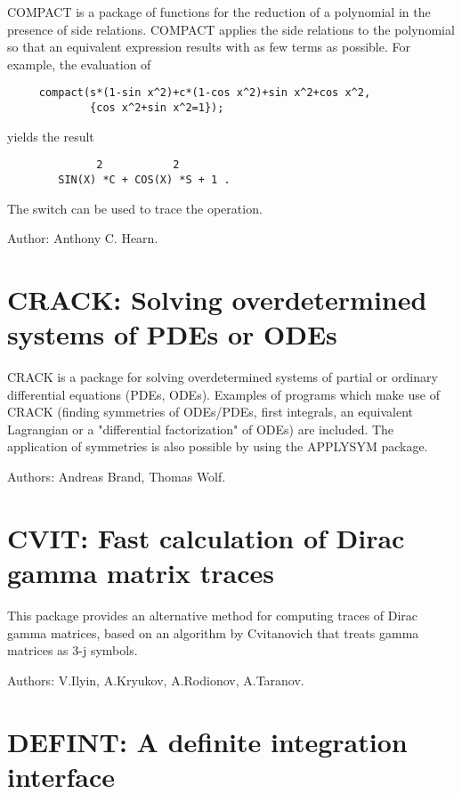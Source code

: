 COMPACT is a package of functions for the reduction of a polynomial in the
presence of side relations.  COMPACT applies the side relations to the
polynomial so that an equivalent expression results with as few terms as
possible.  For example, the evaluation of
\begin{verbatim}
     compact(s*(1-sin x^2)+c*(1-cos x^2)+sin x^2+cos x^2,
             {cos x^2+sin x^2=1});
\end{verbatim}
yields the result\pagebreak[1]
\begin{verbatim}
              2           2
        SIN(X) *C + COS(X) *S + 1 .
\end{verbatim}
The switch  can be used to trace the operation.

Author:  Anthony C. Hearn.


\newpage

\section{CRACK: Solving overdetermined systems of PDEs or ODEs}

CRACK is a package for solving overdetermined systems of partial or
ordinary differential equations (PDEs, ODEs).  Examples of programs which
make use of CRACK (finding symmetries of ODEs/PDEs, first integrals, an
equivalent Lagrangian or a "differential factorization" of ODEs) are
included.  The application of symmetries is also possible by using the
APPLYSYM package.

Authors: Andreas Brand, Thomas Wolf.

\newpage

\section{CVIT: Fast calculation of Dirac gamma matrix traces}
\label{CVIT}

This package provides an alternative method for computing traces of Dirac
gamma matrices, based on an algorithm by Cvitanovich that treats gamma
matrices as 3-j symbols.

Authors: V.Ilyin, A.Kryukov, A.Rodionov, A.Taranov.



\newpage

\section{DEFINT: A definite integration interface}
\label{DEFINT}

